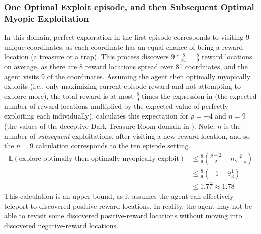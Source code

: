 \documentclass{article}
\begin{document}
\subsubsection{One Optimal Exploit episode, and then Subsequent Optimal Myopic Exploitation}
In this domain, perfect exploration in the first episode corresponds to visiting \(9\) unique coordinates, as each coordinate has an equal chance of being a reward location (a treasure or a trap). This process discovers \(9*\frac{8}{81} = \frac{8}{9}\) reward locations on average, as there are 8 reward locations spread over 81 coordinates, and the agent visits 9 of the coordinates.
Assuming the agent then optimally myopically exploits (i.e., only maximizing current-episode reward and not attempting to explore more), the total reward is at most \(\frac{8}{9}\) times the expression in  (the expected number of reward locations multiplied by the expected value of perfectly exploiting each individually).
 calculates this expectation for \(\rho=-4\) and \(n=9\) (the values of the deceptive Dark Treasure Room domain in ). Note, \(n\) is the number of \emph{subsequent} exploitations, after visiting a new reward location, and so the \(n=9\) calculation corresponds to the ten episode setting.
\begin{align}
\label{eqn:optimalcalc}
\mathbb{E}(\text{explore optimally then optimally myopically exploit}) &\leq \frac{8}{9}\left(\frac{\rho + 2}{2} + n\frac{2}{2-\rho}\right)\\
&\leq \frac{8}{9}(-1 + 9\frac{1}{3})\\
&\leq 1.7\overline{7} \approx 1.78
\end{align}
This calculation is an upper bound, as it assumes the agent can effectively teleport to discovered positive reward locations. In reality, the agent may not be able to revisit some discovered positive-reward locations without moving into discovered negative-reward locations.
\FloatBarrier
\clearpage
\pagebreak
\end{document}
